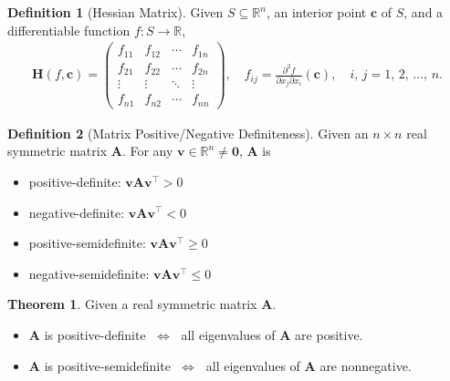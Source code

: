 \documentclass[10pt,handout]{beamer}
\newcommand{\ds}{\displaystyle}
\newcommand{\ifff}{\;\Longleftrightarrow\;}
\theoremstyle{definition}
\newtheorem*{dfn}{Definition}
\newtheorem*{thm}{Theorem}
\newcommand{\vc}{\mathbf{c}}
\newcommand{\vv}{\mathbf{v}}
\newcommand{\vH}{\mathbf{H}}
\newcommand{\vA}{\mathbf{A}}
\newcommand{\vZero}{\mathbf{0}}
\begin{document}
\begin{frame}
  \begin{dfn}[Hessian Matrix]
    Given $\ds S\subseteq\mathbb{R}^n$, an interior point $\vc$ of $S$, and a differentiable function $\ds f:S\to\mathbb{R}$, \vspace{-3mm}
    \begin{align*}
      \vH(f, \vc) = \begin{pmatrix}f_{11} & f_{12} & \cdots & f_{1n} \\ f_{21} & f_{22} & \cdots & f_{2n} \\ \vdots & \vdots & \ddots & \vdots \\ f_{n1} & f_{n2} & \cdots & f_{nn}\end{pmatrix}, \quad f_{ij} = \frac{\partial^2 f}{\partial x_j\partial x_i}(\vc), \quad i,\,j = 1,\,2,\,\ldots,\,n.
    \end{align*}
  \end{dfn}

  \begin{dfn}[Matrix Positive/Negative Definiteness] 
    Given an $n\times n$ real symmetric matrix $\vA$. For any $\ds\vv\in\mathbb{R}^n\ne\vZero$, $\vA$ is \vspace{-3mm}
    \begin{multicols}{2}
      \begin{itemize}
        \item positive-definite: $\ds\vv\vA\vv^\top > 0$ 
        \item negative-definite: $\ds\vv\vA\vv^\top < 0$
        \item positive-semidefinite: $\ds\vv\vA\vv^\top\geqslant 0$
        \item negative-semidefinite: $\ds\vv\vA\vv^\top\leqslant 0$
      \end{itemize}
    \end{multicols}
  \end{dfn}
  \begin{thm}
    Given a real symmetric matrix $\vA$.  
    \begin{itemize}
      \item $\vA$ is positive-definite $\ifff$ all eigenvalues of $\vA$ are positive.  
      \item $\vA$ is positive-semidefinite $\ifff$ all eigenvalues of $\vA$ are nonnegative.
    \end{itemize}
  \end{thm}

\end{frame}
\end{document}
